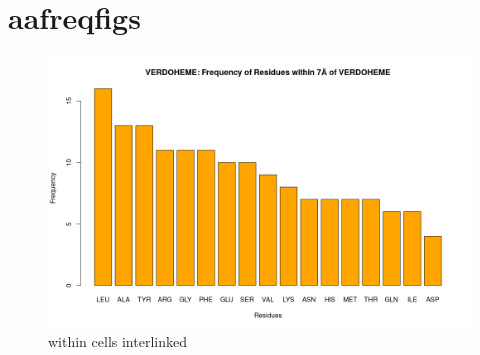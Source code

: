 \section{aafreqfigs}
	
	\begin{figure}
		\caption{within cells interlinked}
		\label{figs:HEM_aafreq}
		\includegraphics{figures/fuckinghell.png}
	\end{figure}
	
